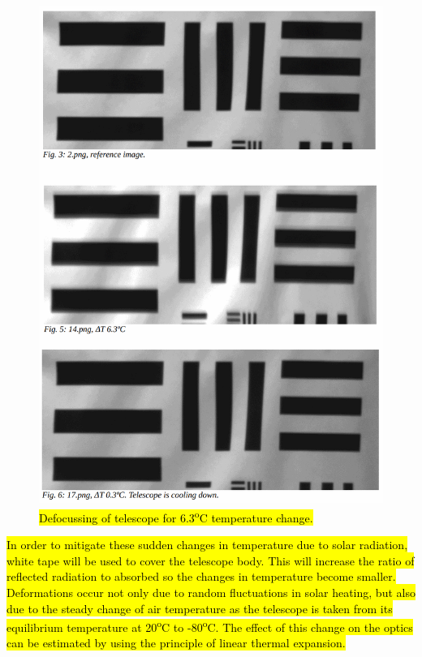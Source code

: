 	\begin{figure}[H]
    \centering	
	\includegraphics[scale=0.2]{4-experiment-design/img/mechanical/focusdrift.png}
	\caption{\hl{Defocussing of telescope for 6.3\textsuperscript{o}C temperature change.}}
	\label{fig:focusdrift}
    	\end{figure}
 
\hl{In order to mitigate these sudden changes in temperature due to solar radiation, white tape will be used to cover the telescope body. This will increase the ratio of reflected radiation to absorbed so the changes in temperature become smaller.}\\

\hl{Deformations occur not only due to random fluctuations in solar heating, but also due to the steady change of air temperature as the telescope is taken from its equilibrium temperature at 20\textsuperscript{o}C to -80\textsuperscript{o}C. The effect of this change on the optics can be estimated by using the principle of linear thermal expansion.}

